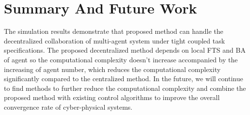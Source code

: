 \documentclass[journal]{IEEEtran}
\begin{document}
\section{Summary And Future Work}

The simulation results demonstrate that proposed method can handle the decentralized collaboration of multi-agent system under tight coupled task specifications. The proposed decentralized method depends on local FTS and BA of agent so the computational complexity doesn't increase accompanied by the increasing of agent number, which reduces the computational complexity significantly compared to the centralized method. In the future, we will continue to find methods to further reduce the computational complexity and combine the proposed method with existing control algorithms to improve the overall convergence rate of cyber-physical systems.


%
%
%
%





%
%
%
\end{document}
